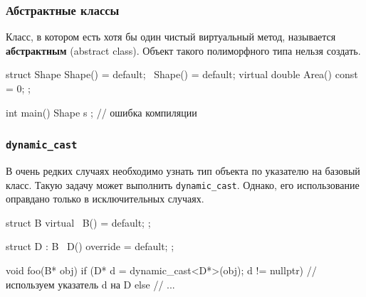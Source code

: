\documentclass[compress, 8pt, aspectratio=169]{beamer}
\begin{document}
\begin{frame}[fragile]

    \frametitle{Абстрактные классы}

    Класс, в котором есть хотя бы один чистый виртуальный метод, называется
    \textbf{абстрактным} (abstract class).
    Объект такого полиморфного типа нельзя создать.

    \begin{myinplacelisting}[minted language=cpp]
struct Shape {
    Shape() = default;
    ~Shape() = default;
    virtual double Area() const = 0;
};

int main() {
    Shape s {}; // ошибка компиляции
}
    \end{myinplacelisting}

\end{frame}

\begin{frame}[fragile]

    \frametitle{\texttt{dynamic\_cast}}

    \hfill\break
    В очень редких случаях необходимо узнать тип объекта по указателю на
    базовый класс.
    Такую задачу может выполнить \verb|dynamic_cast|.
    Однако, его использование оправдано только в исключительных
    случаях\footnotemark{}.

    \begin{myinplacelisting}[minted language=cpp]
struct B {
    virtual ~B() = default;
};

struct D : B {
    ~D() override = default;
};

void foo(B* obj) {
    if (D* d = dynamic_cast<D*>(obj); d != nullptr) {
        // используем указатель d на D
    }
    else {
        // ...
    }
}
    \end{myinplacelisting}


\end{frame}
\end{document}
